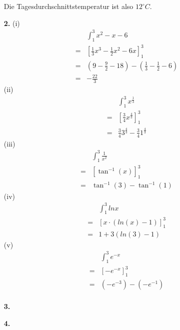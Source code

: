 \documentclass[a4paper,11pt]{article}
\begin{document}
\begin{enumerate}
            Die Tagesdurchschnittstemperatur ist also $12^{\circ}C$.
        \item[\textbf{2.}]
            \subitem(i)
                \begin{align*}
                    &&\int_1^3 x^2-x-6 \\
                    &=&[\frac{1}{3}x^3-\frac{1}{2}x^2-6x]_1^3\\
                    &=&(9-\frac{9}{2}-18)-(\frac{1}{3}-\frac{1}{2}-6)\\
                    &=&-\frac{22}{3}
                \end{align*}
            \subitem(ii)
                \begin{align*}
                    &&\int_1^3 x^{\frac{1}{3}} \\
                    &=&[\frac{3}{4}x^{\frac{4}{3}}]_1^3 \\
                    &=&\frac{3}{4}3^{\frac{4}{3}} - \frac{3}{4}1^{\frac{4}{3}}
                \end{align*}
            \subitem(iii)
                \begin{align*}
                    &&\int_1^3 \frac{1}{x^2} \\
                    &=&[\tan^{-1}(x)]_1^3 \\
                    &=&\tan^{-1}(3) - \tan^{-1}(1)
                \end{align*}
            \subitem(iv)
                \begin{align*}
                    &&\int_1^3 ln x \\
                    &=&[x \cdot (ln(x)-1)]_1^3 \\
                    &=&1+3(ln(3)-1)
                \end{align*}
            \subitem(v)
                \begin{align*}
                    &&\int_1^3 e^{-x} \\
                    &=&[-e^{-x}]_1^3 \\
                    &=&(-e^{-3})-(-e^{-1})\\
                \end{align*}

        \item[\textbf{3.}]
	\todo

        \item[\textbf{4.}]
	\todo

    \end{enumerate}
\end{document}
